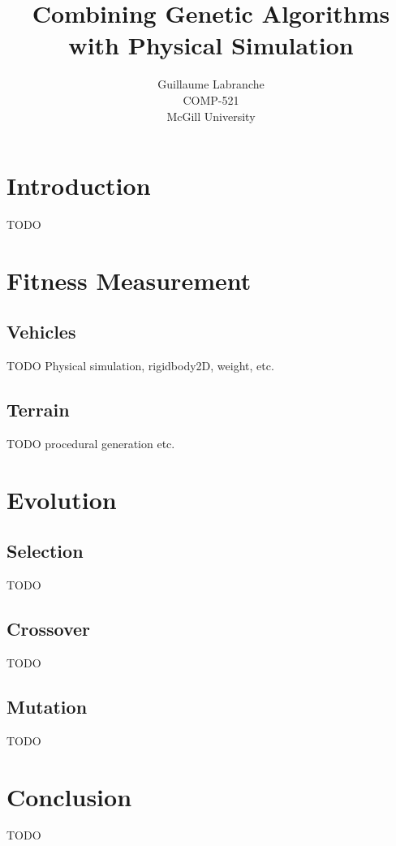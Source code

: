 \documentclass[oneside]{article}
\begin{document}
\title{Combining Genetic Algorithms with Physical Simulation}
\author{Guillaume Labranche\\
  COMP-521\\
  McGill University}
\maketitle

\tableofcontents

\section{Introduction}

TODO

\section{Fitness Measurement}

\subsection{Vehicles}

TODO Physical simulation, rigidbody2D, weight, etc.

\subsection{Terrain}

TODO procedural generation etc.

\section{Evolution}


\subsection{Selection}

TODO

\subsection{Crossover}

TODO

\subsection{Mutation}

TODO

\section{Conclusion}

TODO

\end{document}
